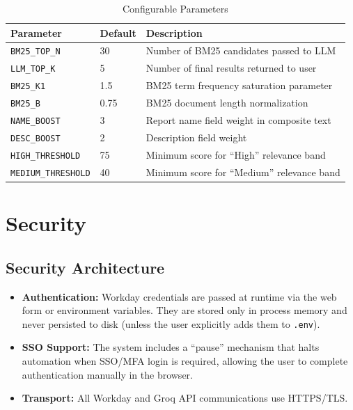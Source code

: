 \documentclass[12pt,a4paper]{article}
\begin{document}
\begin{table}[H]
\centering
\caption{Configurable Parameters}
\label{tab:config-params}
\begin{tabularx}{\textwidth}{l l X}
\toprule
\textbf{Parameter} & \textbf{Default} & \textbf{Description} \\
\midrule
\texttt{BM25\_TOP\_N} & 30 & Number of BM25 candidates passed to LLM \\
\texttt{LLM\_TOP\_K} & 5 & Number of final results returned to user \\
\texttt{BM25\_K1} & 1.5 & BM25 term frequency saturation parameter \\
\texttt{BM25\_B} & 0.75 & BM25 document length normalization \\
\texttt{NAME\_BOOST} & 3 & Report name field weight in composite text \\
\texttt{DESC\_BOOST} & 2 & Description field weight \\
\texttt{HIGH\_THRESHOLD} & 75 & Minimum score for ``High'' relevance band \\
\texttt{MEDIUM\_THRESHOLD} & 40 & Minimum score for ``Medium'' relevance band \\
\bottomrule
\end{tabularx}
\end{table}

\section{Security}
\label{sec:security}

\subsection{Security Architecture}
\label{subsec:security-arch}

\begin{itemize}[leftmargin=2em]
  \item \textbf{Authentication:} Workday credentials are passed at runtime via the web form or environment variables. They are stored only in process memory and never persisted to disk (unless the user explicitly adds them to \texttt{.env}).
  \item \textbf{SSO Support:} The system includes a ``pause'' mechanism that halts automation when SSO/MFA login is required, allowing the user to complete authentication manually in the browser.
  \item \textbf{Transport:} All Workday and Groq API communications use HTTPS/TLS.
\end{itemize}
\end{document}
